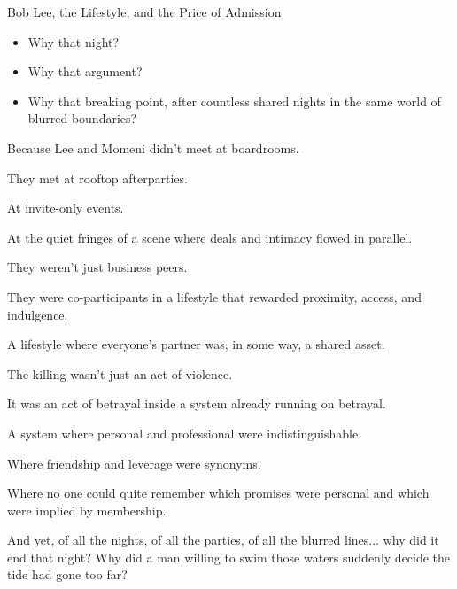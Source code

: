 \begin{HistoricalSidebar}{Bob Lee, the Lifestyle, and the Price of Admission}
  \begin{itemize}
    \item Why that night?
    \item Why that argument?
    \item Why that breaking point, after countless shared nights in the same world of blurred boundaries?
  \end{itemize}
  
  \medskip
  
  Because Lee and Momeni didn’t meet at boardrooms.

  \medskip
  
  They met at rooftop afterparties.

  \medskip
  
  At invite-only events.

  \medskip
  
  At the quiet fringes of a scene where deals and intimacy flowed in parallel.

  \medskip
  
  They weren’t just business peers.

  \medskip
  
  They were co-participants in a lifestyle that rewarded proximity, access, and indulgence.

  \medskip
  
  A lifestyle where everyone’s partner was, in some way, a shared asset.
  
  \medskip
  
  The killing wasn’t just an act of violence.

  \medskip
  
  It was an act of betrayal inside a system already running on betrayal.

  \medskip
  
  A system where personal and professional were indistinguishable.

  \medskip
  
  Where friendship and leverage were synonyms.

  \medskip
  
  Where no one could quite remember which promises were personal and which were implied by membership.
  
  \medskip
  
  And yet, of all the nights, of all the parties, of all the blurred lines... why did it end that night?  
  Why did a man willing to swim those waters suddenly decide the tide had gone too far?


\end{HistoricalSidebar}
